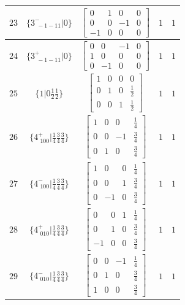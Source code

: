 \documentclass[fleqn,8pt]{jsarticle}
\begin{document}
\begin{longtable}{ccccc}
$ 23 $ & $ \{3^{-}_{\,\,-1-11}|0\} $ & $ \begin{bmatrix} 0 & 1 & 0 & 0 \\ 0 & 0 & -1 & 0 \\ -1 & 0 & 0 & 0 \end{bmatrix} $ & $ 1 $ & $ 1 $ \\ \hline
$ 24 $ & $ \{3^{+}_{\,\,-1-11}|0\} $ & $ \begin{bmatrix} 0 & 0 & -1 & 0 \\ 1 & 0 & 0 & 0 \\ 0 & -1 & 0 & 0 \end{bmatrix} $ & $ 1 $ & $ 1 $ \\ \hline
$ 25 $ & $ \{1|0 \frac{1}{2} \frac{1}{2}\} $ & $ \begin{bmatrix} 1 & 0 & 0 & 0 \\ 0 & 1 & 0 & \frac{1}{2} \\ 0 & 0 & 1 & \frac{1}{2} \end{bmatrix} $ & $ 1 $ & $ 1 $ \\ \hline
$ 26 $ & $ \{4^{+}_{\,\,100}|\frac{1}{4} \frac{3}{4} \frac{3}{4}\} $ & $ \begin{bmatrix} 1 & 0 & 0 & \frac{1}{4} \\ 0 & 0 & -1 & \frac{3}{4} \\ 0 & 1 & 0 & \frac{3}{4} \end{bmatrix} $ & $ 1 $ & $ 1 $ \\ \hline
$ 27 $ & $ \{4^{-}_{\,\,100}|\frac{1}{4} \frac{3}{4} \frac{3}{4}\} $ & $ \begin{bmatrix} 1 & 0 & 0 & \frac{1}{4} \\ 0 & 0 & 1 & \frac{3}{4} \\ 0 & -1 & 0 & \frac{3}{4} \end{bmatrix} $ & $ 1 $ & $ 1 $ \\ \hline
$ 28 $ & $ \{4^{+}_{\,\,010}|\frac{1}{4} \frac{3}{4} \frac{3}{4}\} $ & $ \begin{bmatrix} 0 & 0 & 1 & \frac{1}{4} \\ 0 & 1 & 0 & \frac{3}{4} \\ -1 & 0 & 0 & \frac{3}{4} \end{bmatrix} $ & $ 1 $ & $ 1 $ \\ \hline
$ 29 $ & $ \{4^{-}_{\,\,010}|\frac{1}{4} \frac{3}{4} \frac{3}{4}\} $ & $ \begin{bmatrix} 0 & 0 & -1 & \frac{1}{4} \\ 0 & 1 & 0 & \frac{3}{4} \\ 1 & 0 & 0 & \frac{3}{4} \end{bmatrix} $ & $ 1 $ & $ 1 $ \\ \hline

\end{longtable}
\end{document}
